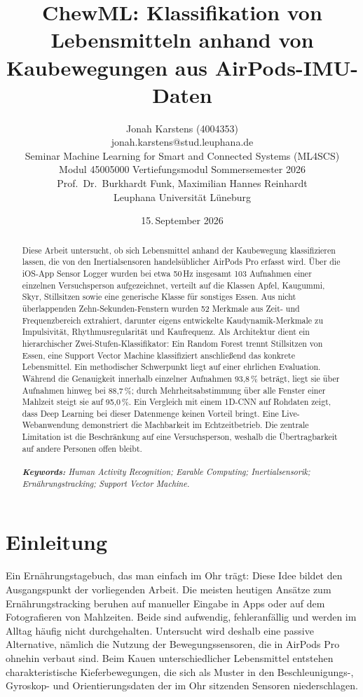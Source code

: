 \documentclass[11pt]{article}
\title{ChewML: Klassifikation von Lebensmitteln anhand von Kaubewegungen aus AirPods-IMU-Daten}
\author{Jonah Karstens (4004353)\\%
    jonah.karstens@stud.leuphana.de\\[0.6em]%
    \normalsize Seminar \glqq Machine Learning for Smart and Connected Systems\grqq{} (ML4SCS)\\%
    \normalsize Modul 45005000 Vertiefungsmodul \textbullet{} Sommersemester 2026\\%
    \normalsize Prof.\ Dr.\ Burkhardt Funk, Maximilian Hannes Reinhardt\\%
    \normalsize Leuphana Universit\"at L\"uneburg}
\date{15.\,September 2026}
\begin{document}
{
\maketitle

\begin{abstract}
\noindent Diese Arbeit untersucht, ob sich Lebensmittel anhand der Kaubewegung
klassifizieren lassen, die von den Inertialsensoren handelsüblicher AirPods Pro erfasst
wird. Über die iOS-App Sensor Logger wurden bei etwa 50\,Hz insgesamt 103 Aufnahmen einer
einzelnen Versuchsperson aufgezeichnet, verteilt auf die Klassen Apfel, Kaugummi, Skyr,
Stillsitzen sowie eine generische Klasse für sonstiges Essen. Aus nicht überlappenden
Zehn-Sekunden-Fenstern wurden 52 Merkmale aus Zeit- und Frequenzbereich extrahiert,
darunter eigens entwickelte Kaudynamik-Merkmale zu Impulsivität, Rhythmusregularität und
Kaufrequenz. Als Architektur dient ein hierarchischer Zwei-Stufen-Klassifikator: Ein Random
Forest trennt Stillsitzen von Essen, eine Support Vector Machine klassifiziert anschließend
das konkrete Lebensmittel. Ein methodischer Schwerpunkt liegt auf einer ehrlichen
Evaluation. Während die Genauigkeit innerhalb einzelner Aufnahmen 93,8\,\% beträgt, liegt
sie über Aufnahmen hinweg bei 88,7\,\%; durch Mehrheitsabstimmung über alle Fenster einer
Mahlzeit steigt sie auf 95,0\,\%. Ein Vergleich mit einem 1D-CNN auf Rohdaten zeigt, dass
Deep Learning bei dieser Datenmenge keinen Vorteil bringt. Eine Live-Webanwendung
demonstriert die Machbarkeit im Echtzeitbetrieb. Die zentrale Limitation ist die
Beschränkung auf eine Versuchsperson, weshalb die Übertragbarkeit auf andere Personen offen
bleibt.
\\
\\
\noindent
\textit{\textbf{Keywords: }%
Human Activity Recognition; Earable Computing; Inertialsensorik; Ernährungstracking; Support Vector Machine.} \\

\end{abstract}
}

\section{Einleitung}

Ein Ernährungstagebuch, das man einfach im Ohr trägt: Diese Idee bildet den Ausgangspunkt
der vorliegenden Arbeit. Die meisten heutigen Ansätze zum Ernährungstracking beruhen auf
manueller Eingabe in Apps oder auf dem Fotografieren von Mahlzeiten. Beide sind aufwendig,
fehleranfällig und werden im Alltag häufig nicht durchgehalten. Untersucht wird deshalb
eine passive Alternative, nämlich die Nutzung der Bewegungssensoren, die in AirPods Pro
ohnehin verbaut sind. Beim Kauen unterschiedlicher Lebensmittel entstehen charakteristische
Kieferbewegungen, die sich als Muster in den Beschleunigungs-, Gyroskop- und
Orientierungsdaten der im Ohr sitzenden Sensoren niederschlagen.
\end{document}
